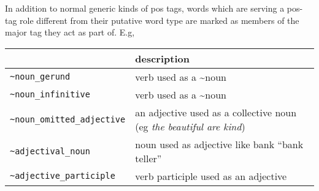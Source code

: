 \documentclass[]{article}
\begin{document}
In addition to normal generic kinds of pos tags, words which are serving
a pos-tag role different from their putative word type are marked as
members of the major tag they act as part of. E.g,

\begin{longtable}[]{@{}ll@{}}
\toprule
\begin{minipage}[b]{0.41\columnwidth}\raggedright\strut
\strut
\end{minipage} & \begin{minipage}[b]{0.20\columnwidth}\raggedright\strut
description\strut
\end{minipage}\tabularnewline
\midrule
\endhead
\begin{minipage}[t]{0.41\columnwidth}\raggedright\strut
\texttt{\textasciitilde{}noun\_gerund}\strut
\end{minipage} & \begin{minipage}[t]{0.20\columnwidth}\raggedright\strut
verb used as a \textasciitilde{}noun\strut
\end{minipage}\tabularnewline
\begin{minipage}[t]{0.41\columnwidth}\raggedright\strut
\texttt{\textasciitilde{}noun\_infinitive}\strut
\end{minipage} & \begin{minipage}[t]{0.20\columnwidth}\raggedright\strut
verb used as a \textasciitilde{}noun\strut
\end{minipage}\tabularnewline
\begin{minipage}[t]{0.41\columnwidth}\raggedright\strut
\texttt{\textasciitilde{}noun\_omitted\_adjective}\strut
\end{minipage} & \begin{minipage}[t]{0.20\columnwidth}\raggedright\strut
an adjective used as a collective noun (eg \emph{the beautiful are
kind})\strut
\end{minipage}\tabularnewline
\begin{minipage}[t]{0.41\columnwidth}\raggedright\strut
\texttt{\textasciitilde{}adjectival\_noun}\strut
\end{minipage} & \begin{minipage}[t]{0.20\columnwidth}\raggedright\strut
noun used as adjective like bank ``bank teller''\strut
\end{minipage}\tabularnewline
\begin{minipage}[t]{0.41\columnwidth}\raggedright\strut
\texttt{\textasciitilde{}adjective\_participle}\strut
\end{minipage} & \begin{minipage}[t]{0.20\columnwidth}\raggedright\strut
verb participle used as an adjective\strut
\end{minipage}\tabularnewline
\bottomrule
\end{longtable}
\end{document}

